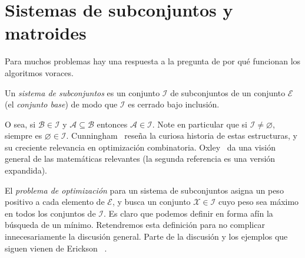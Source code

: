 

\chapter{Sistemas de subconjuntos y matroides}
\label{cha:matroids}

  Para muchos problemas hay una respuesta
  a la pregunta de por qué funcionan los algoritmos voraces.
  \begin{definition}
    Un \emph{sistema de subconjuntos} es un conjunto \(\mathscr{I}\)
    de subconjuntos de un conjunto \(\mathscr{E}\)
    (el \emph{conjunto base})
    de modo que \(\mathscr{I}\) es cerrado bajo inclusión.
  \end{definition}
  O sea,
  si \(\mathscr{B} \in \mathscr{I}\) y \(\mathscr{A} \subseteq \mathscr{B}\)
  entonces \(\mathscr{A} \in \mathscr{I}\).
  Note en particular que si \(\mathscr{I} \ne \varnothing\),
  siempre es \(\varnothing \in \mathscr{I}\).
  Cunningham~%
    \cite{cunningham12:_coming_matroids}
  reseña la curiosa historia de estas estructuras,
  y su creciente relevancia en optimización combinatoria.
  Oxley~%
    \cite{oxley03:_matroids,oxley14:_matroids}
  da una visión general de las matemáticas relevantes
  (la segunda referencia es una versión expandida).

  El \emph{problema de optimización} para un sistema de subconjuntos
  asigna un peso positivo a cada elemento de \(\mathscr{E}\),
  y busca un conjunto \(\mathscr{X} \in \mathscr{I}\)
  cuyo peso sea máximo en todos los conjuntos de \(\mathscr{I}\).
  Es claro que podemos definir en forma afín la búsqueda de un mínimo.
  Retendremos esta definición
  para no complicar innecesariamente la discusión general.
  Parte de la discusión y los ejemplos que siguen vienen de Erickson~%
    \cite{erickson19:_algorithms}.


